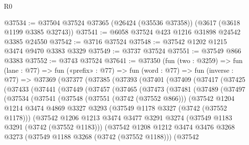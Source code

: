 \begin{lexlean}{R0}
\begin{coremodule}
@37534 := @37504 @37524 @37365 (@26424 (@35536 @37358)) (@3617 (@3618 @1199 @3385 @32743))
@37541 := @6058 @37524 @423 @1216 @31898 @24542 @3385 @24550
@37542 := @3716 @37524
@37548 := @37542 @1202 @1215 @3474 @9470 @3383 @3329
@37549 := @3737 @37524
@37551 := @37549 @866 @3383
@37552 := @3743 @37524
@37641 := @37350
    (fun (two : @3259) =>
    fun (lane : @77) =>
    fun («prefix» : @77) =>
    fun (word : @77) =>
    fun (inverse : @77) =>
    @37369
      (@37377
        (@37385
          (@37393
            (@37401
              (@37409
                (@37417
                  (@37425
                    (@37433
                      (@37441
                        (@37449
                          (@37457
                            (@37465
                              (@37473
                                (@37481
                                  (@37489
                                    (@37497
                                      (@37534
                                        (@37541
                                          (@37548
                                            (@37551 (@3742 (@37552 @866)))
                                            (@37542
                                              @1204
                                              @1214
                                              @3474
                                              @4869
                                              @3327
                                              @3293
                                              (@37549 @1178 @3327 (@3742 (@37552 @1178)))
                                              (@37542
                                                @1206
                                                @1213
                                                @3474
                                                @3477
                                                @3291
                                                @3274
                                                (@37549 @1183 @3291 (@3742 (@37552 @1183)))
                                                (@37542
                                                  @1208
                                                  @1212
                                                  @3474
                                                  @3476
                                                  @3268
                                                  @3273
                                                  (@37549 @1188 @3268 (@3742 (@37552 @1188)))
                                                  (@37542

\end{coremodule}
\end{lexlean}
